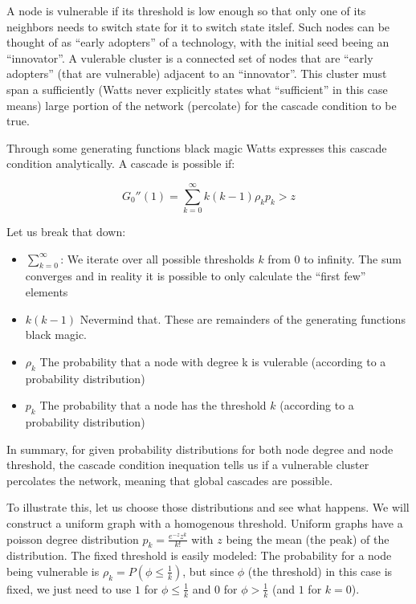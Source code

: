 \documentclass{sig-alternate-05-2015}
\begin{document}
A node is vulnerable if its threshold is low enough so that only one of its neighbors needs to switch state for it to switch state itslef. Such nodes can be thought of as ``early adopters'' of a technology, with the initial seed beeing an ``innovator''. A vulerable cluster is a connected set of nodes that are ``early adopters'' (that are vulnerable) adjacent to an ``innovator''. This cluster must span a sufficiently (Watts never explicitly states what ``sufficient'' in this case means) large portion of the network (percolate) for the cascade condition to be true.

Through some generating functions black magic Watts expresses this cascade condition analytically. A cascade is possible if:

\begin{equation}
  G_0''(1) = \sum_{k=0}^\infty k (k-1) \rho_k p_k > z
\end{equation}

Let us break that down:

\begin{itemize}
  \item $\sum_{k=0}^\infty$: We iterate over all possible thresholds $k$ from $0$ to infinity. The sum converges and in reality it is possible to only calculate the ``first few'' elements
  \item $k (k-1)$ Nevermind that. These are remainders of the generating functions black magic.
  \item $\rho_k$ The probability that a node with degree k is vulerable (according to a probability distribution)
  \item $p_k$ The probability that a node has the threshold $k$ (according to a probability distribution)
\end{itemize}

In summary, for given probability distributions for both node degree and node threshold, the cascade condition inequation tells us if a vulnerable cluster percolates the network, meaning that global cascades are possible.

To illustrate this, let us choose those distributions and see what happens. We will construct a uniform graph with a homogenous threshold. Uniform graphs have a poisson degree distribution $p_k = \frac{e^{-z}z^k}{k!}$ with $z$ being the mean (the peak) of the distribution. The fixed threshold is easily modeled: The probability for a node being vulnerable is $\rho_k = P(\phi \leq \frac{1}{k})$, but since $\phi$ (the threshold) in this case is fixed, we just need to use $1$ for $\phi \leq \frac{1}{k}$ and $0$ for $\phi > \frac{1}{k}$ (and $1$ for $k = 0$).
\end{document}
